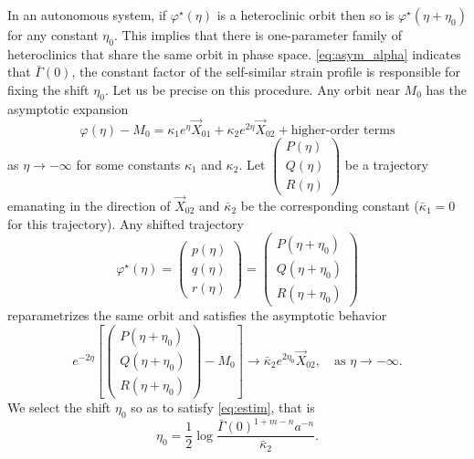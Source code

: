 \documentclass[a4paper,11pt]{article}
\def\bG{\bar{\Gamma}}
\numberwithin{step}{dummy}
\begin{document}
In an autonomous system, if $\varphi^\star(\eta)$ is a heteroclinic orbit then so is $\varphi^\star(\eta+\eta_0)$ for any constant $\eta_0$. This implies that there is one-parameter family of heteroclinics that share the same orbit in phase space. 
\eqref{eq:asym_alpha} indicates that $\bG(0)$, the constant factor of the self-similar strain profile is responsible for fixing the shift $\eta_0$. Let us be precise on this procedure.
Any orbit near $M_0$ has the asymptotic expansion
\begin{equation}
 \varphi(\eta) - M_0 = \kappa_1e^\eta \vec{X}_{01} + \kappa_2e^{2\eta} \vec{X}_{02} + \text{higher-order terms} \label{eq:expansion}
\end{equation}
as $\eta \rightarrow -\infty$ for some constants $\kappa_1$ and $\kappa_2$. Let $\begin{pmatrix} P(\eta)\\Q(\eta)\\R(\eta) \end{pmatrix}$ be a trajectory
emanating in the direction of $\vec{X}_{02}$ and $\bar\kappa_2$ be the corresponding constant ($\bar\kappa_1=0$ for this trajectory). 
Any shifted trajectory 
$$
 \varphi^\star(\eta) = \begin{pmatrix} p(\eta)\\q(\eta)\\r(\eta) \end{pmatrix} = \begin{pmatrix} P(\eta+\eta_0)\\Q(\eta+\eta_0)\\R(\eta+\eta_0) \end{pmatrix}
$$ 
reparametrizes the same orbit and satisfies the asymptotic behavior
$$e^{-2\eta}\left[\begin{pmatrix}
   P(\eta+\eta_0)\\Q(\eta+\eta_0)\\R(\eta+\eta_0)
  \end{pmatrix}
  - M_0\right]
  \rightarrow {\bar\kappa_2e^{2\eta_0}}\vec{X}_{02}, \quad \text{as $\eta \rightarrow -\infty$.}
$$
We select the shift $\eta_0$ so as to satisfy \eqref{eq:estim}, that is
$$\eta_0 = \frac{1}{2}\log \frac{\bG(0)^{1+m-n}a^{-n}}{\bar\kappa_2}.$$
\end{document}
